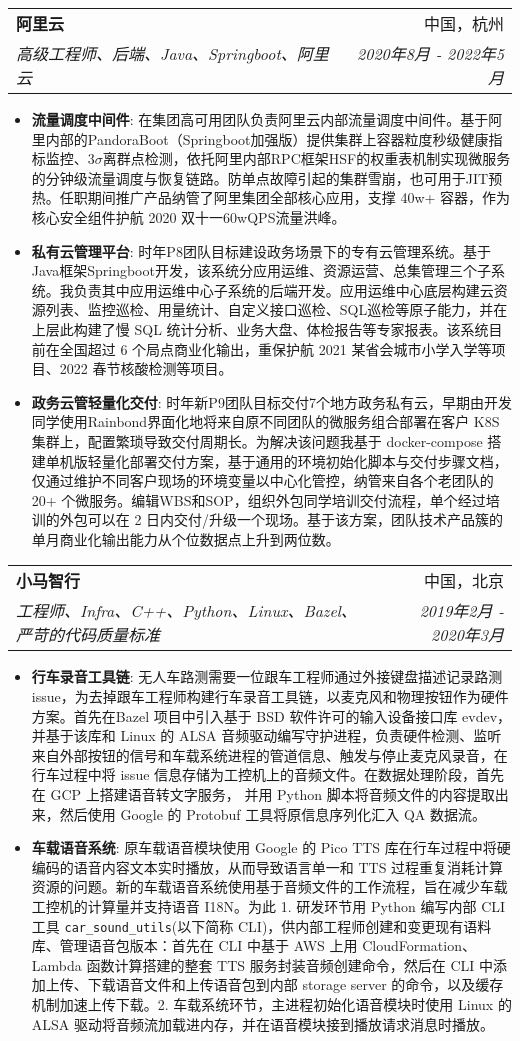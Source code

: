 \documentclass[letterpaper,11pt]{article}
\makeatletter
\newcommand{\resumeItem}[2]{
	\item\small{
		\textbf{#1}{: #2 \vspace{-2pt}}
	}
}
\newcommand{\resumeSubheading}[4]{
	\vspace{-1pt}\item
	\begin{tabular*}{0.97\textwidth}[t]{l@{\extracolsep{\fill}}r}
		\textbf{#1} & #2 \\
		\textit{\small#3} & \textit{\small #4} \\
	\end{tabular*}\vspace{-5pt}
}
\newcommand{\resumeItemListStart}{\begin{itemize}}
\newcommand{\resumeItemListEnd}{\end{itemize}\vspace{-5pt}}
\makeatother
\begin{document}
\begin{spacing}{1.0}
		
		\resumeSubheading
		{阿里云}{中国，杭州}
		{高级工程师、后端、Java、Springboot、阿里云}{2020年8月 - 2022年5月}
		\resumeItemListStart
		\resumeItem{流量调度中间件}
		{在集团高可用团队负责阿里云内部流量调度中间件。基于阿里内部的PandoraBoot（Springboot加强版）提供集群上容器粒度秒级健康指标监控、$3\sigma$离群点检测，依托阿里内部RPC框架HSF的权重表机制实现微服务的分钟级流量调度与恢复链路。防单点故障引起的集群雪崩，也可用于JIT预热。任职期间推广产品纳管了阿里集团全部核心应用，支撑 40w+ 容器，作为核心安全组件护航 2020 双十一60wQPS流量洪峰。}
		\resumeItem{私有云管理平台}
		{时年P8团队目标建设政务场景下的专有云管理系统。基于Java框架Springboot开发，该系统分应用运维、资源运营、总集管理三个子系统。我负责其中应用运维中心子系统的后端开发。应用运维中心底层构建云资源列表、监控巡检、用量统计、自定义接口巡检、SQL巡检等原子能力，并在上层此构建了慢 SQL 统计分析、业务大盘、体检报告等专家报表。该系统目前在全国超过 6 个局点商业化输出，重保护航 2021 某省会城市小学入学等项目、2022 春节核酸检测等项目。}
		\resumeItem{政务云管轻量化交付}
		{时年新P9团队目标交付7个地方政务私有云，早期由开发同学使用Rainbond界面化地将来自原不同团队的微服务组合部署在客户 K8S 集群上，配置繁琐导致交付周期长。为解决该问题我基于 docker-compose 搭建单机版轻量化部署交付方案，基于通用的环境初始化脚本与交付步骤文档，仅通过维护不同客户现场的环境变量以中心化管控，纳管来自各个老团队的 20+ 个微服务。编辑WBS和SOP，组织外包同学培训交付流程，单个经过培训的外包可以在 2 日内交付/升级一个现场。基于该方案，团队技术产品簇的单月商业化输出能力从个位数据点上升到两位数。}
		\resumeItemListEnd
		
		\resumeSubheading
		{小马智行}{中国，北京}
		{工程师、Infra、C++、Python、Linux、Bazel、严苛的代码质量标准}{2019年2月 - 2020年3月}
		\resumeItemListStart
		\resumeItem{行车录音工具链}
		{无人车路测需要一位跟车工程师通过外接键盘描述记录路测 issue，为去掉跟车工程师构建行车录音工具链，以麦克风和物理按钮作为硬件方案。首先在Bazel 项目中引入基于 BSD 软件许可的输入设备接口库 evdev，并基于该库和 Linux 的 ALSA 音频驱动编写守护进程，负责硬件检测、监听来自外部按钮的信号和车载系统进程的管道信息、触发与停止麦克风录音，在行车过程中将 issue 信息存储为工控机上的音频文件。在数据处理阶段，首先在 GCP 上搭建语音转文字服务， 并用 Python 脚本将音频文件的内容提取出来，然后使用 Google 的 Protobuf 工具将原信息序列化汇入 QA 数据流。}
		\resumeItem{车载语音系统}
		{原车载语音模块使用 Google 的 Pico TTS 库在行车过程中将硬编码的语音内容文本实时播放，从而导致语言单一和 TTS 过程重复消耗计算资源的问题。新的车载语音系统使用基于音频文件的工作流程，旨在减少车载工控机的计算量并支持语音 I18N。为此 1. 研发环节用 Python 编写内部 CLI 工具 \texttt{car\_sound\_utils}(以下简称 CLI)，供内部工程师创建和变更现有语料库、管理语音包版本：首先在 CLI 中基于 AWS 上用 CloudFormation、Lambda 函数计算搭建的整套 TTS 服务封装音频创建命令，然后在 CLI 中添加上传、下载语音文件和上传语音包到内部 storage server 的命令，以及缓存机制加速上传下载。2. 车载系统环节，主进程初始化语音模块时使用 Linux 的 ALSA 驱动将音频流加载进内存，并在语音模块接到播放请求消息时播放。}
		\resumeItemListEnd
		

\end{spacing}
\end{document}
